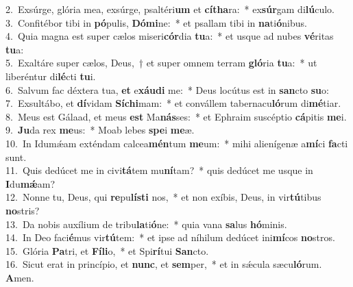 {2.~}Exsúrge, glória mea, exsúrge, psaltéri\textbf{um} et \textbf{cí}\textbf{tha}ra:~* ex\textbf{súr}gam di\textbf{lú}culo.\\
{3.~}Confitébor tibi in \textbf{pó}pulis, \textbf{Dó}\textbf{mi}ne:~* et psallam tibi in \textbf{na}ti\textbf{ó}nibus.\\
{4.~}Quia magna est super cælos miseri\textbf{cór}dia \textbf{tu}a:~* et usque ad nubes \textbf{vé}ritas \textbf{tu}a:\\
{5.~}Exaltáre super cælos, Deus,~† et super omnem terram \textbf{gló}ria \textbf{tu}a:~* ut liberéntur di\textbf{lé}cti \textbf{tu}i.\\
{6.~}Salvum fac déxtera tua, \textbf{et} e\textbf{xáu}\textbf{di} me:~* Deus locútus est in \textbf{san}cto \textbf{su}o:\\
{7.~}Exsultábo, et \textbf{dí}vidam \textbf{Sí}\textbf{chi}mam:~* et convállem tabernacu\textbf{ló}rum di\textbf{mé}tiar.\\
{8.~}Meus est Gálaad, et meus \textbf{est} Ma\textbf{nás}ses:~* et Ephraim suscéptio \textbf{cá}pitis \textbf{me}i.\\
{9.~}\textbf{Ju}da rex \textbf{me}us:~* Moab lebes \textbf{spe}i \textbf{me}æ.\\
{10.~}In Idumǽam exténdam calcea\textbf{mén}tum \textbf{me}um:~* mihi alienígenæ a\textbf{mí}ci \textbf{fa}cti sunt.\\
{11.~}Quis dedúcet me in civi\textbf{tá}tem mu\textbf{ní}tam?~* quis dedúcet me usque in \textbf{I}du\textbf{mǽ}am?\\
{12.~}Nonne tu, Deus, qui \textbf{re}pu\textbf{lí}\textbf{sti} nos,~* et non exíbis, Deus, in vir\textbf{tú}tibus \textbf{no}stris?\\
{13.~}Da nobis auxílium de tribu\textbf{la}ti\textbf{ó}ne:~* quia vana \textbf{sa}lus \textbf{hó}minis.\\
{14.~}In Deo faci\textbf{é}mus vir\textbf{tú}tem:~* et ipse ad níhilum dedúcet ini\textbf{mí}cos \textbf{no}stros.\\
{15.~}Glória \textbf{Pa}tri, et \textbf{Fí}\textbf{li}o,~* et Spi\textbf{rí}tui \textbf{San}cto.\\
{16.~}Sicut erat in princípio, et \textbf{nunc}, et \textbf{sem}per,~* et in sǽcula sæcu\textbf{ló}rum. \textbf{A}men.\\
